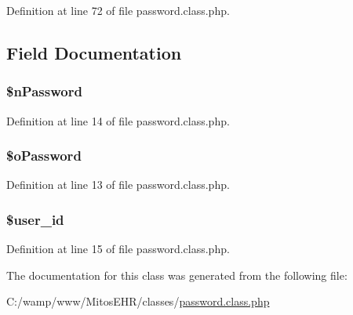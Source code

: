 \-Definition at line 72 of file password.\-class.\-php.




\subsection{\-Field \-Documentation}
\hypertarget{classpassword_abf6a1b81b2df703a88051df830fa4c3b}{
\subsubsection[{\$n\-Password}]{\setlength{\rightskip}{0pt plus 5cm}\$n\-Password}}\label{classpassword_abf6a1b81b2df703a88051df830fa4c3b}


\-Definition at line 14 of file password.\-class.\-php.

\hypertarget{classpassword_a45254ea52f68306c737105b330ef23a8}{
\subsubsection[{\$o\-Password}]{\setlength{\rightskip}{0pt plus 5cm}\$o\-Password}}\label{classpassword_a45254ea52f68306c737105b330ef23a8}


\-Definition at line 13 of file password.\-class.\-php.

\hypertarget{classpassword_af0fcd925f00973e32f7214859dfb3c6b}{
\subsubsection[{\$user\-\_\-id}]{\setlength{\rightskip}{0pt plus 5cm}\$user\-\_\-id}}\label{classpassword_af0fcd925f00973e32f7214859dfb3c6b}


\-Definition at line 15 of file password.\-class.\-php.



\-The documentation for this class was generated from the following file\-:\begin{DoxyCompactItemize}
\item 
\-C\-:/wamp/www/\-Mitos\-E\-H\-R/classes/\hyperlink{password_8class_8php}{password.\-class.\-php}\end{DoxyCompactItemize}
